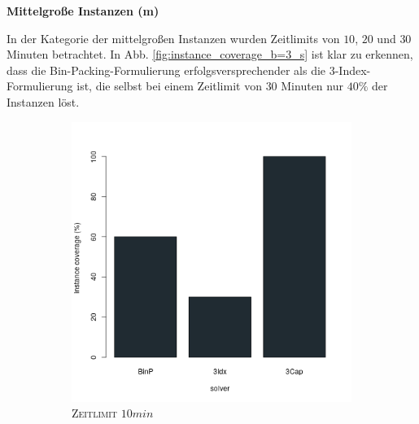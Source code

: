 \textbf{Mittelgroße Instanzen (m)}

In der Kategorie der mittelgroßen Instanzen wurden Zeitlimits von $10$, $20$ und $30$ Minuten betrachtet.
In Abb. \ref{fig:instance_coverage_b=3_s} ist klar zu erkennen, dass die Bin-Packing-Formulierung erfolgsversprechender
als die 3-Index-Formulierung ist, die selbst bei einem Zeitlimit von $30$ Minuten nur $40 \%$ der Instanzen löst.

\begin{figure}[H]
\centering

\begin{subfigure}[b]{0.3\textwidth}
\centering
\includegraphics[width=1.2\textwidth]{img/solver_instance_coverage_b=3_m_600s.png}
\caption{\textsc{Zeitlimit} $10min$}
\label{}
\end{subfigure}
\hfill
\begin{subfigure}[b]{0.3\textwidth}
\centering

\end{subfigure}
\end{figure}
